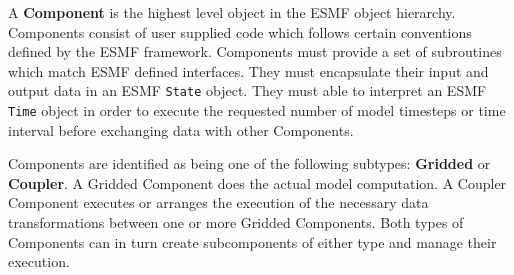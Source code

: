 %


A {\bf Component}
is the highest level object in the ESMF object
hierarchy.  Components consist of user supplied code
which follows certain conventions defined by the ESMF framework.
Components must provide a set of subroutines which match ESMF
defined interfaces. They must encapsulate
their input and output data in an ESMF {\tt State} object.  They
must able to interpret an ESMF {\tt Time} object in order
to execute the requested number of model timesteps or time interval
before exchanging data with other Components.

Components are identified as being one of the
following subtypes: {\bf Gridded} or {\bf Coupler}.
A Gridded Component
does the actual model computation.  
A Coupler Component executes or
arranges the execution of the necessary data transformations between one
or more Gridded Components.
Both types of Components can in turn create subcomponents of either type
and manage their execution.


